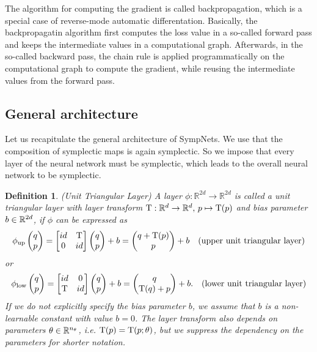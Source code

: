\documentclass[twoside,a4paper]{article}
\newtheorem{definition}{Definition}
\begin{document}
The algorithm for computing the gradient is called backpropagation, which
is a special case of reverse-mode automatic differentation.
Basically, the backpropagatin algorithm first computes the loss value 
in a so-called forward pass
and keeps the intermediate values in a computational graph.
Afterwards, in the so-called backward pass, the chain rule is applied programmatically
on the computational graph to compute the gradient, while reusing the intermediate values
from the forward pass.

\subsection{General architecture}

Let us recapitulate the general architecture of SympNets.
We use that the composition of symplectic maps is again symplectic. So we impose that every
layer of the neural network must be symplectic, which leads to the overall neural network
to be symplectic.

\begin{definition}
	(Unit Triangular Layer) A layer $\phi : \mathbb{R}^{2d} \to \mathbb{R}^{2d}$ 
	is called a unit triangular layer with layer transform 
	$\mathrm{T} : \mathbb{R}^d \to \mathbb{R}^d,\, p \mapsto \mathrm{T}(p)$
	and bias parameter $b \in \mathbb{R}^{2d}$, if $\phi$ can be expressed as
	\begin{equation*}
		\phi_{\text{up}} \begin{pmatrix} q \\ p \end{pmatrix} = \begin{bmatrix} id & {\mathrm{T}} \\ 0 & id \end{bmatrix} \begin{pmatrix} q \\ p \end{pmatrix} + b
		= \begin{pmatrix}
			q + \mathrm{T}(p) \\
			p
		\end{pmatrix} + b \quad \text{(upper unit triangular layer)}
	\end{equation*}
	or
	\begin{equation*}
		\phi_{\text{low}} \begin{pmatrix} q \\ p \end{pmatrix} = \begin{bmatrix} id & 0 \\ {\mathrm{T}} & id \end{bmatrix} \begin{pmatrix} q \\ p \end{pmatrix} + b
		= \begin{pmatrix}
			q \\
			\mathrm{T}(q) + p
		\end{pmatrix} + b. \quad \text{(lower unit triangular layer)}
	\end{equation*}
	If we do not explicitly specify the bias parameter $b$, we assume
	that $b$ is a non-learnable constant with value $b=0$. The layer transform
	also depends on parameters $\theta \in \mathbb{R}^{n_\theta}$, i.e.
	$\mathrm{T}(p) = \mathrm{T}(p;\theta)$, 
	but we suppress the dependency on the parameters for shorter notation.
\end{definition}
\end{document}
